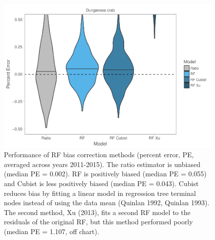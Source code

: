 \documentclass[]{article}
\begin{document}
\begin{figure}

{\centering \includegraphics[width=6in]{bycatch_sim_paper_files/figure-latex/rf-cubist-1} 

}

\caption{Performance of RF bias correction methods (percent error, PE, averaged across years 2011-2015). The ratio estimator is unbiased (median PE = 0.002). RF is positively biased (median PE = 0.055) and Cubist is less positively biased (median PE = 0.043). Cubist reduces bias by fitting a linear model in regression tree terminal nodes instead of using the data mean (Quinlan 1992, Quinlan 1993). The second method, Xu (2013), fits a second RF model to the residuals of the original RF, but this method performed poorly (median PE = 1.107, off chart).}\label{fig:rf-cubist}
\end{figure}
\end{document}
